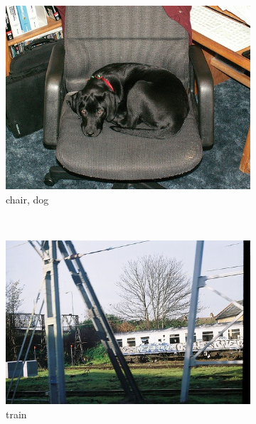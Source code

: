 \begin{figure}[bt]
    \centering
    \begin{subfigure}[b]{0.18\textwidth}
        \centering
        \includegraphics[width=\textwidth]{000063}
        \caption{\scriptsize chair, dog}
        \label{fig:voc1}
    \end{subfigure}
    ~
    \begin{subfigure}[b]{0.18\textwidth}
        \centering
        \includegraphics[width=\textwidth]{000024}
        \caption{\scriptsize train}
        \label{fig:voc2}
    \end{subfigure}
    ~
    \begin{subfigure}[b]{0.18\textwidth}
        \centering

\end{subfigure}
\end{figure}
